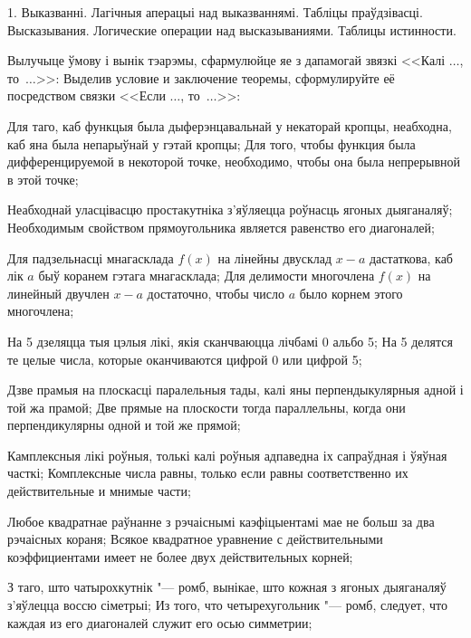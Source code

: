 \documentclass[12pt, a4paper]{article}
\begin{document}
\biLangHeader
{1. Выказванні. Лагічныя аперацыі над выказваннямі. Табліцы праўдзівасці.}
{Высказывания. Логические операции над высказываниями. Таблицы истинности.}

\begin{problemList}

\problemItemSimple
{Вылучыце ўмову і вынік тэарэмы, сфармулюйце яе з дапамогай звязкі <<Калі $\ldots$, то~$\ldots$>>:}
{Выделив условие и заключение теоремы, сформулируйте её посредством связки <<Если $\ldots$, то~$\ldots$>>:}

\begin{belarusianEnumerate}

\problemItemSimple
{Для таго, каб функцыя была дыферэнцавальнай у некаторай кропцы, неабходна, каб яна была непарыўнай у гэтай кропцы;}
{Для того, чтобы функция была дифференцируемой в некоторой точке, необходимо, чтобы она была непрерывной в этой точке;}

\problemItemSimple
{Неабходнай уласцівасцю простакутніка з'яўляецца роўнасць ягоных дыяганаляў;}
{Необходимым свойством прямоугольника является равенство его диагоналей;}

\problemItemSimple
{Для падзельнасці мнагасклада $f(x)$ на лінейны двусклад $x - a$ дастаткова, каб лік $a$ быў коранем гэтага мнагасклада;}
{Для делимости многочлена $f(x)$ на линейный двучлен $x - a$ достаточно, чтобы число $a$ было корнем этого многочлена;}

\problemItemSimple
{На 5 дзеляцца тыя цэлыя лікі, якія сканчваюцца лічбамі 0 альбо 5;}
{На 5 делятся те целые числа, которые оканчиваются цифрой 0 или цифрой 5;}

\problemItemSimple
{Дзве прамыя на плоскасці паралельныя тады, калі яны перпендыкулярныя адной і той жа прамой;}
{Две прямые на плоскости тогда параллельны, когда они перпендикулярны одной и той же прямой;}

\problemItemSimple
{Камплексныя лікі роўныя, толькі калі роўныя адпаведна іх сапраўдная і ўяўная часткі;}
{Комплексные числа равны, только если равны соответственно их действительные и мнимые части;}

\problemItemSimple
{Любое квадратнае раўнанне з рэчаіснымі каэфіцыентамі мае не больш за два рэчаісных кораня;}
{Всякое квадратное уравнение с действительными коэффициентами имеет не более двух действительных корней;}

\problemItemSimple
{З таго, што чатырохкутнік "--- ромб, вынікае, што кожная з ягоных дыяганаляў з'яўлецца воссю сіметрыі;}
{Из того, что четырехугольник "--- ромб, следует, что каждая из его диагоналей служит его осью симметрии;}


\end{belarusianEnumerate}
\end{problemList}
\end{document}
